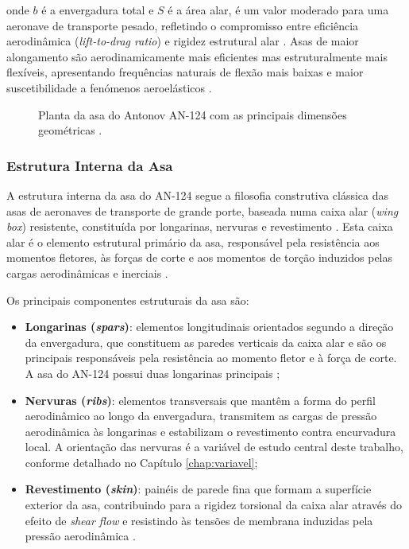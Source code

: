 \documentclass[a4paper,fleqn]{cas-sc}
\begin{document}
\noindent onde $b$ é a envergadura total e $S$ é a área alar, é um valor moderado para uma aeronave de transporte pesado, refletindo o compromisso entre eficiência aerodinâmica (\textit{lift-to-drag ratio}) e rigidez estrutural alar \cite{Raymer2018}. Asas de maior alongamento são aerodinamicamente mais eficientes mas estruturalmente mais flexíveis, apresentando frequências naturais de flexão mais baixas e maior suscetibilidade a fenómenos aeroelásticos \cite{Wright2015}.

\begin{figure}
    \centering
    \caption{Planta da asa do Antonov AN-124 com as principais 
    dimensões geométricas \cite{GarciaFernandez2025}.}
    \label{fig:an124_asa_planta}
\end{figure}

\subsubsection{Estrutura Interna da Asa}

A estrutura interna da asa do AN-124 segue a filosofia construtiva clássica das asas de aeronaves de transporte de grande porte, baseada numa caixa alar (\textit{wing box}) resistente, constituída por longarinas, nervuras e revestimento \cite{Niu1988, Megson2012}. Esta caixa alar é o elemento estrutural primário da asa, responsável pela resistência aos momentos fletores, às forças de corte e aos momentos de torção induzidos pelas cargas aerodinâmicas e inerciais \cite{Megson2012}.

Os principais componentes estruturais da asa são:

\begin{itemize}
    \item \textbf{Longarinas (\textit{spars})}: elementos longitudinais orientados segundo a direção da envergadura, que constituem as paredes verticais da caixa alar e são os principais responsáveis pela resistência ao momento fletor e à força de corte. A asa do AN-124 possui duas longarinas principais \cite{GarciaFernandez2025};

    \item \textbf{Nervuras (\textit{ribs})}: elementos transversais que mantêm a forma do perfil aerodinâmico ao longo da envergadura, transmitem as cargas de pressão aerodinâmica às longarinas e estabilizam o revestimento contra encurvadura local. A orientação das nervuras é a variável de estudo central deste trabalho, conforme detalhado no Capítulo \ref{chap:variavel};

    \item \textbf{Revestimento (\textit{skin})}: painéis de parede fina que formam a superfície exterior da asa, contribuindo para a rigidez torsional da caixa alar através do efeito de \textit{shear flow} e resistindo às tensões de membrana induzidas pela pressão aerodinâmica \cite{Megson2012}.
\end{itemize}
\end{document}
